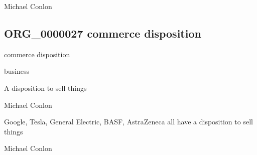 \documentclass[letterpaper,10pt,english]{sphinxmanual}
\begin{document}
\begin{sphinxShadowBox}

\sphinxAtStartPar
Michael Conlon 
\end{sphinxShadowBox}
\begin{quote}

\ignorespaces \end{quote}


\subsection{ORG\_0000027 \sphinxhyphen{} commerce disposition}
\label{\detokenize{doc-ORG_0000027:org-0000027-commerce-disposition}}\label{\detokenize{doc-ORG_0000027:index-0}}\label{\detokenize{doc-ORG_0000027::doc}}
\begin{sphinxShadowBox}

\sphinxAtStartPar
commerce disposition
\end{sphinxShadowBox}

\begin{sphinxShadowBox}

\sphinxAtStartPar
business
\end{sphinxShadowBox}

\begin{sphinxShadowBox}

\sphinxAtStartPar
A disposition to sell things
\end{sphinxShadowBox}

\begin{sphinxShadowBox}

\sphinxAtStartPar
Michael Conlon 
\end{sphinxShadowBox}

\begin{sphinxShadowBox}

\sphinxAtStartPar
Google, Tesla, General Electric, BASF, AstraZeneca all have a disposition to sell things
\end{sphinxShadowBox}

\begin{sphinxShadowBox}

\sphinxAtStartPar
Michael Conlon 
\end{sphinxShadowBox}
\begin{quote}

\ignorespaces \end{quote}
\end{document}
